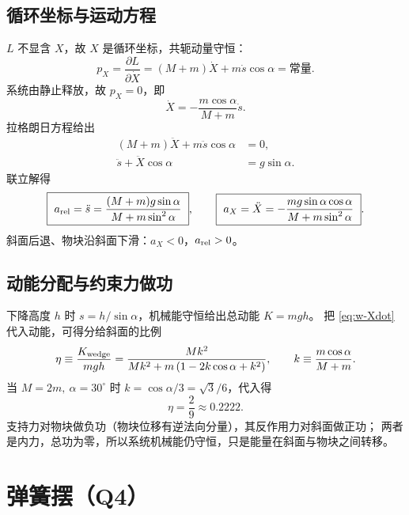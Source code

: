 \documentclass[UTF8,a4paper,11pt]{ctexart}
\begin{document}
\subsection{循环坐标与运动方程}

$L$ 不显含 $X$，故 $X$ 是循环坐标，共轭动量守恒：
\begin{equation}
  p_X=\frac{\partial L}{\partial\dot X}=(M+m)\dot X+m\dot s\cos\alpha=\text{常量}.
  \label{eq:w-pX}
\end{equation}
系统由静止释放，故 $p_X=0$，即
\begin{equation}
  \dot X=-\frac{m\cos\alpha}{M+m}\dot s .
  \label{eq:w-Xdot}
\end{equation}
拉格朗日方程给出
\begin{align}
  (M+m)\ddot X+m\ddot s\cos\alpha&=0, \label{eq:w-eqX}\\
  \ddot s+\ddot X\cos\alpha&=g\sin\alpha. \label{eq:w-eqs}
\end{align}
联立解得
\begin{equation}
  \boxed{\ a_{\rm rel}=\ddot s=\frac{(M+m)g\sin\alpha}{M+m\sin^2\alpha}\ },\qquad
  \boxed{\ a_X=\ddot X=-\frac{mg\sin\alpha\cos\alpha}{M+m\sin^2\alpha}\ }.
  \label{eq:w-acc}
\end{equation}
斜面后退、物块沿斜面下滑：$a_X<0$，$a_{\rm rel}>0$。

\subsection{动能分配与约束力做功}

下降高度 $h$ 时 $s=h/\sin\alpha$，机械能守恒给出总动能 $K=mgh$。
把 \eqref{eq:w-Xdot} 代入动能，可得分给斜面的比例
\begin{equation}
  \eta\equiv\frac{K_{\rm wedge}}{mgh}
  =\frac{Mk^2}{Mk^2+m\left(1-2k\cos\alpha+k^2\right)},
  \qquad k\equiv\frac{m\cos\alpha}{M+m}.
  \label{eq:w-eta}
\end{equation}
当 $M=2m,\ \alpha=30^\circ$ 时 $k=\cos\alpha/3=\sqrt3/6$，代入得
\begin{equation}
  \eta=\frac{2}{9}\approx0.2222 .
  \label{eq:w-eta-29}
\end{equation}
支持力对物块做负功（物块位移有逆法向分量），其反作用力对斜面做正功；
两者是内力，总功为零，所以系统机械能仍守恒，只是能量在斜面与物块之间转移。

\section{弹簧摆（Q4）}\label{sec:spring}
\end{document}
